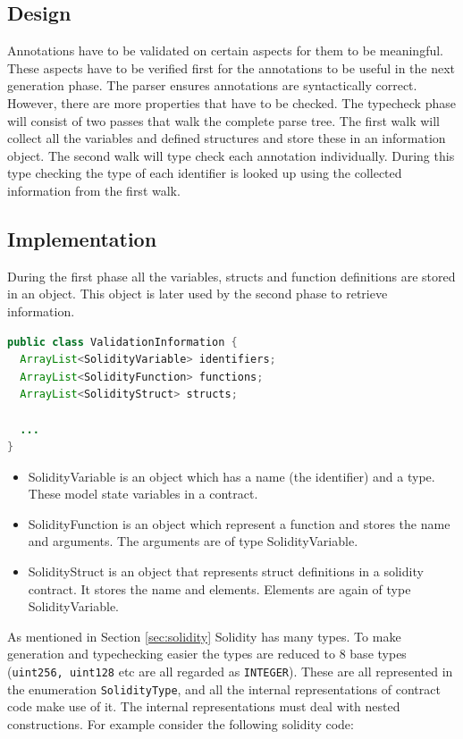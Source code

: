 \documentclass[a4paper]{article}
\begin{document}
\subsection{Design}
Annotations have to be validated on certain aspects for them to be meaningful. These aspects have to be verified first for the annotations to be useful in the next generation phase. The parser ensures annotations are syntactically correct. However, there are more properties that have to be checked. The typecheck phase will consist of two passes that walk the complete parse tree. The first walk will collect all the variables and defined structures and store these in an information object. The second walk will type check each annotation individually. During this type checking the type of each identifier is looked up using the collected information from the first walk. 
\subsection{Implementation}
During the first phase all the variables, structs and function definitions are stored in an object. This object is later used by the second phase to retrieve information.
\begin{lstlisting}[breaklines=true, language=Java ]
public class ValidationInformation {
  ArrayList<SolidityVariable> identifiers;
  ArrayList<SolidityFunction> functions;
  ArrayList<SolidityStruct> structs;

  ...
}
\end{lstlisting}
\begin{itemize}
  \item SolidityVariable is an object which has a name (the identifier) and a type. These model state variables in a contract.
  \item SolidityFunction is an object which represent a function and stores the name and arguments. The arguments are of type SolidityVariable.
  \item SolidityStruct is an object that represents struct definitions in a solidity contract. It stores the name and elements. Elements are again of type SolidityVariable.
\end{itemize}
As mentioned in Section \ref{sec:solidity} Solidity has many types. To make generation and typechecking easier the types are reduced to 8 base types (\texttt{uint256, uint128} etc are all regarded as \texttt{INTEGER}). These are all represented in the enumeration \texttt{SolidityType}, and all the internal representations of contract code make use of it. The internal representations must deal with nested constructions. For example consider the following solidity code:
\end{document}
